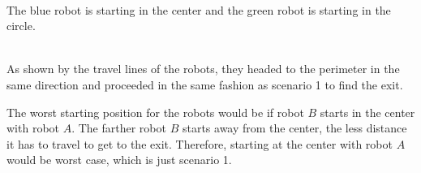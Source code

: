 \documentclass[12pt,letterpaper]{article}
\begin{document}
        \begin{center}
             \\
            The blue robot is starting in the center and the green robot is starting in the circle.
        \end{center}
%         
%         
        \begin{center}
             \\
            As shown by the travel lines of the robots, they headed to the perimeter in the same direction and proceeded in the same fashion as scenario 1 to find the exit.
        \end{center}
    
        The worst starting position for the robots would be if robot $B$ starts in the center with robot $A$. The farther robot $B$ starts away from the center, the less distance it has to travel to get to the exit. Therefore, starting at the center with robot $A$ would be worst case, which is just scenario 1.
        
\end{document}
